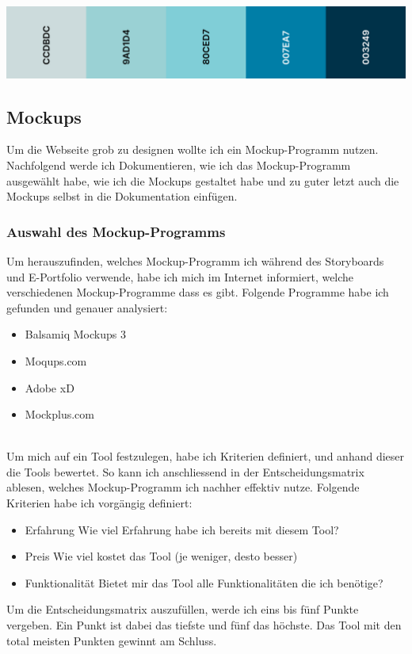\documentclass[11pt]{article}
\begin{document}
    \includegraphics[width=\textwidth]{media/color_palette}

    \subsection{Mockups}
    Um die Webseite grob zu designen wollte ich ein Mockup-Programm nutzen. Nachfolgend werde ich Dokumentieren,
    wie ich das Mockup-Programm ausgewählt habe, wie ich die Mockups gestaltet habe und zu guter letzt auch
    die Mockups selbst in die Dokumentation einfügen.

    \subsubsection{Auswahl des Mockup-Programms}
    Um herauszufinden, welches Mockup-Programm ich während des Storyboards und E-Portfolio verwende, habe ich
    mich im Internet informiert, welche verschiedenen Mockup-Programme dass es gibt. Folgende Programme habe
    ich gefunden und genauer analysiert:

    \begin{itemize}
        \item Balsamiq Mockups 3
        \item Moqups.com
        \item Adobe xD
        \item Mockplus.com
    \end{itemize}\\
    Um mich auf ein Tool festzulegen, habe ich Kriterien definiert, und anhand dieser die Tools bewertet. So
    kann ich anschliessend in der Entscheidungsmatrix ablesen, welches Mockup-Programm ich nachher effektiv
    nutze. Folgende Kriterien habe ich vorgängig definiert:

    \begin{itemize}
        \item Erfahrung \textrightarrow Wie viel Erfahrung habe ich bereits mit diesem Tool?
        \item Preis \textrightarrow Wie viel kostet das Tool (je weniger, desto besser)
        \item Funktionalität \textrightarrow Bietet mir das Tool alle Funktionalitäten die ich benötige?
    \end{itemize}
    Um die Entscheidungsmatrix auszufüllen, werde ich eins bis fünf Punkte vergeben. Ein Punkt ist dabei das tiefste
    und fünf das höchste. Das Tool mit den total meisten Punkten gewinnt am Schluss.\\
\end{document}

